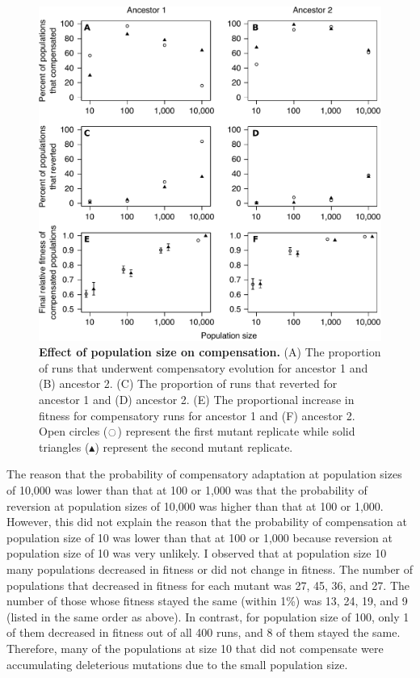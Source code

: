 \begin{doublespace}
\begin{figure}
\begin{center}
\includegraphics[width=\linewidth]{effect-N.pdf}
\end{center}
\caption{{\bf Effect of population size on compensation.}
  (A) The proportion of runs that underwent compensatory evolution
  for ancestor 1 and (B) ancestor 2.
  (C) The proportion of runs that reverted
  for ancestor 1 and (D) ancestor 2.
  (E) The proportional increase in fitness for compensatory runs
  for ancestor 1 and (F) ancestor 2.
  Open circles ($\ocircle$) represent the first mutant replicate
  while solid triangles ($\blacktriangle$)
  represent the second mutant replicate.}
\label{fig:N_comp}
\end{figure}



The reason that the probability of compensatory adaptation
at population sizes of 10,000 was lower than that at 100 or 1,000
was that the probability of reversion
at population sizes of 10,000 was higher than that at 100 or 1,000.
%
However, this did not explain the reason that the probability of compensation
at population size of 10 was lower than that at 100 or 1,000
because reversion at population size of 10 was very unlikely.
%
I observed that at population size 10
many populations decreased in fitness or did not change in fitness.
%
The number of populations that decreased in fitness
for each mutant was 27, 45, 36, and 27.
%
The number of those whose fitness stayed the same (within 1\%) was
13, 24, 19, and 9 (listed in the same order as above).
%
In contrast, for population size of 100, only 1 of them
decreased in fitness out of all 400 runs, and 8 of them stayed the same.
%
Therefore, many of the populations at size 10 that did not compensate
were accumulating deleterious mutations due to the small population size.




\end{doublespace}

